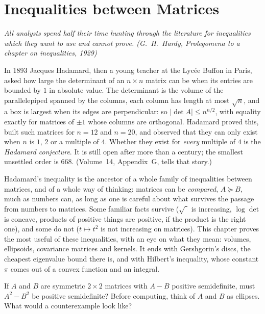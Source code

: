 \chapter{Inequalities between Matrices}\label{linear:ch:inequalities}

\begin{center}\itshape
All analysts spend half their time hunting through the literature for inequalities which they want to use and cannot prove.
\upshape(G.~H.~Hardy, \emph{Prolegomena to a chapter on inequalities}, 1929)
\end{center}

In 1893 Jacques Hadamard, then a young teacher at the Lyc\'ee Buffon in Paris, asked how large the determinant of an $n\times n$
matrix can be when its entries are bounded by $1$ in absolute value. The determinant is the volume of the parallelepiped spanned by
the columns, each column has length at most $\sqrt n$, and a box is largest when its edges are perpendicular: so $|\det A|\le n^{n/2}$,
with equality exactly for matrices of $\pm1$ whose columns are orthogonal. Hadamard proved this, built such matrices for $n=12$
and $n=20$, and observed that they can only exist when $n$ is $1$, $2$ or a multiple of $4$. Whether they exist for \emph{every}
multiple of $4$ is the \emph{Hadamard conjecture}. It is still open after more than a century; the smallest unsettled order is
$668$. (Volume~14, Appendix~G, tells that story.)

Hadamard's inequality is the ancestor of a whole family of inequalities between matrices, and of a whole way of thinking: matrices
can be \emph{compared}, $A\succeq B$, much as numbers can, as long as one is careful about what survives the passage from numbers to
matrices. Some familiar facts survive ($\sqrt{\phantom{t}}$ is increasing, $\log\det$ is concave, products of positive things are
positive, if the product is the right one), and some do not ($t\mapsto t^2$ is not increasing on matrices). This chapter proves
the most useful of these inequalities, with an eye on what they mean: volumes, ellipsoids, covariance matrices and kernels. It ends
with Gershgorin's discs, the cheapest eigenvalue bound there is, and with Hilbert's inequality, whose constant $\pi$ comes out of a
convex function and an integral.

\begin{think}
If $A$ and $B$ are symmetric $2\times2$ matrices with $A-B$ positive semidefinite, must $A^2-B^2$ be positive semidefinite?
Before computing, think of $A$ and $B$ as ellipses. What would a counterexample look like?
\end{think}

